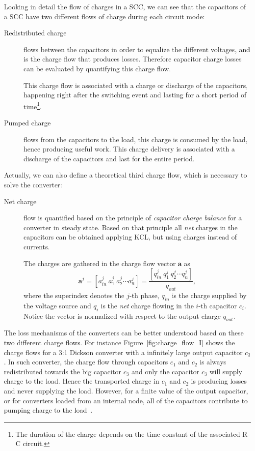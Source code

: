 Looking in detail the flow of charges in a SCC, we can see that the capacitors of a SCC have two different flows of charge during each circuit mode:
\begin{description}

  \item[Redistributed charge] flows between the capacitors in order to equalize the different voltages, and is the charge flow that produces losses. Therefore capacitor charge losses can be evaluated by quantifying this charge flow.       
      
      This charge flow is associated with a charge or discharge of the capacitors, happening right after the switching event and lasting for a short period of time\footnote{The duration of the charge depends on the time constant of the associated R-C circuit.}.

  \item[Pumped charge] flows from the capacitors to the load, this charge is consumed by the load, hence producing useful work.  This charge delivery is associated with a discharge of the capacitors and last for the entire period.     
        
\end{description}
Actually, we can also define a theoretical third charge flow, which is necessary to solve the converter:
\begin{description}

  \item[Net charge] flow is quantified based on the principle of \emph{capacitor charge balance} for a converter in steady state. Based on that principle all \emph{net} charges in the capacitors can be obtained applying KCL, but using charges instead of currents.
  
     The charges are gathered in the charge flow vector $\mathbf{a}$ as 
       \begin{equation}
        \mathbf{a}^j =  \left[ a_{in}^j~a_1^j~a_2^j \cdots a_n^j \right] = \frac{\left[ q_{in}^j~q_1^j~q_2^j \cdots q_n^j \right]}{q_{out}},
      \label{eq:a_vector}
      \end{equation}
    where the superindex denotes the $j$-th phase, $q_{in}$ is the charge supplied by the voltage source and $q_i$ is the \emph{net} charge flowing in the $i$-th capacitor $c_i$. Notice the vector is normalized with respect to the output charge $q_{out}$.
    
         
\end{description}


The loss mechanisms of the converters can be better understood based on these two different charge flows. For instance Figure~\ref{fig:charge_flow_I} shows the charge flows for a 3:1 Dickson converter with a infinitely large output capacitor $c_3$. In such converter, the charge flow through capacitors $c_1$ and $c_2$ is always redistributed towards the big capacitor $c_3$ and only the capacitor $c_3$ will supply charge to the load. Hence the transported charge in $c_1$ and $c_2$ is producing losses and never supplying the load. However, for a finite value of the output capacitor, or for converters loaded from an internal node, all of the capacitors contribute to pumping charge to the load~\cite{2013Breussegem:c_out}. 

